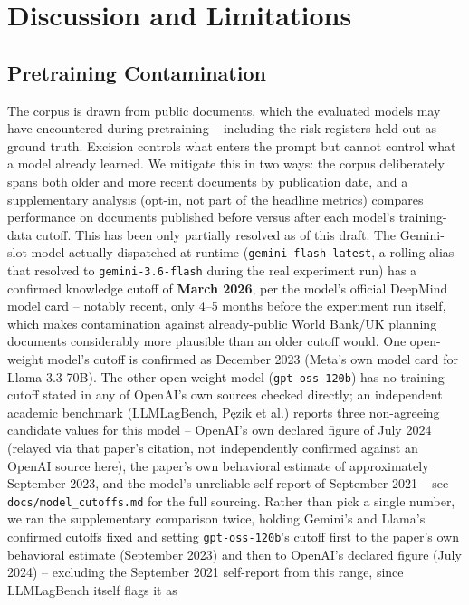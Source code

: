 \documentclass[conference]{IEEEtran}
\begin{document}
\section{Discussion and Limitations}
\label{sec:limitations}

\subsection{Pretraining Contamination}
The corpus is drawn from public documents, which the evaluated models may
have encountered during pretraining -- including the risk registers held
out as ground truth. Excision controls what enters the prompt but cannot
control what a model already learned. We mitigate this in two ways: the
corpus deliberately spans both older and more recent documents by
publication date, and a supplementary analysis (opt-in, not part of the
headline metrics) compares performance on documents published before versus
after each model's training-data cutoff. This has been only partially
resolved as of this draft. The Gemini-slot model actually dispatched at
runtime (\texttt{gemini-flash-latest}, a rolling alias that resolved to
\texttt{gemini-3.6-flash} during the real experiment run) has a confirmed
knowledge cutoff of \textbf{March 2026}, per the model's official DeepMind
model card -- notably recent, only 4--5 months before the experiment run
itself, which makes contamination against already-public World Bank/UK
planning documents considerably more plausible than an older cutoff would.
One open-weight model's cutoff is confirmed as December 2023 (Meta's own
model card for Llama 3.3 70B). The other open-weight model
(\texttt{gpt-oss-120b}) has no training cutoff stated in any of OpenAI's own
sources checked directly; an independent academic benchmark
(LLMLagBench, Pęzik et al.) reports three non-agreeing candidate values for
this model -- OpenAI's own declared figure of July 2024 (relayed via that
paper's citation, not independently confirmed against an OpenAI source
here), the paper's own behavioral estimate of approximately September 2023,
and the model's unreliable self-report of September 2021 -- see
\texttt{docs/model\_cutoffs.md} for the full sourcing. Rather than pick a
single number, we ran the supplementary comparison twice, holding Gemini's
and Llama's confirmed cutoffs fixed and setting \texttt{gpt-oss-120b}'s
cutoff first to the paper's own behavioral estimate (September 2023) and
then to OpenAI's declared figure (July 2024) -- excluding the September 2021
self-report from this range, since LLMLagBench itself flags it as
\end{document}
